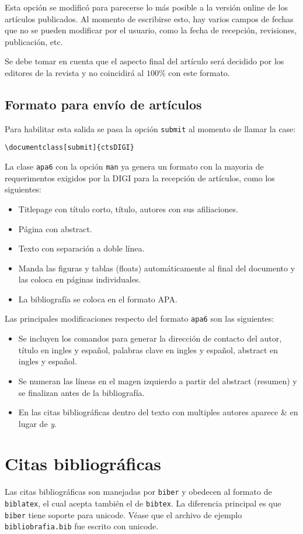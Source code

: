 \documentclass{article}
\begin{document}
Esta opción se modificó para parecerse lo más posible a la versión online de los artículos publicados. Al momento de escribirse esto, hay varios campos de fechas que no se pueden modificar por el usuario, como la fecha de recepción, revisiones, publicación, etc.

Se debe tomar en cuenta que el aspecto final del artículo será decidido por los editores de la revista y no coincidirá al $100\%$ con este formato.

\subsection{Formato para envío de artículos}
Para habilitar esta salida se pasa la opción \texttt{submit} al momento de llamar la case:
\begin{verbatim}
\documentclass[submit]{ctsDIGI}
\end{verbatim}

La clase \texttt{apa6} con la opción \texttt{man} ya genera un formato con la mayoria de requerimentos exigidos por la DIGI para la recepción de artículos, como los siguientes:
\begin{itemize}
\item Titlepage con título corto, título, autores con sus afiliaciones.
\item Página con abstract.
\item Texto con separación a doble línea.
\item Manda las figuras y tablas (floats) automáticamente al final del documento y las coloca en páginas individuales.
\item La bibliografía se coloca en el formato APA.
\end{itemize}

Las principales modificaciones respecto del formato \texttt{apa6} son las siguientes:
\begin{itemize}
\item Se incluyen los comandos para generar la dirección de contacto del autor, título en ingles y español, palabras clave en ingles y español, abstract en ingles y español.
\item Se numeran las líneas en el magen izquierdo a partir del abstract (resumen) y se finalizan antes de la bibliografía.
\item En las citas bibliográficas dentro del texto con multiples autores aparece \& en lugar de \emph{y}.
\end{itemize}


\section{Citas bibliográficas}
Las citas bibliográficas son manejadas por \texttt{biber} y obedecen al formato de \texttt{biblatex}, el cual acepta también el de \texttt{bibtex}. La diferencia principal es que \texttt{biber} tiene soporte para unicode. Véase que el archivo de ejemplo \texttt{bibliobrafia.bib} fue escrito con unicode. 
\end{document}
